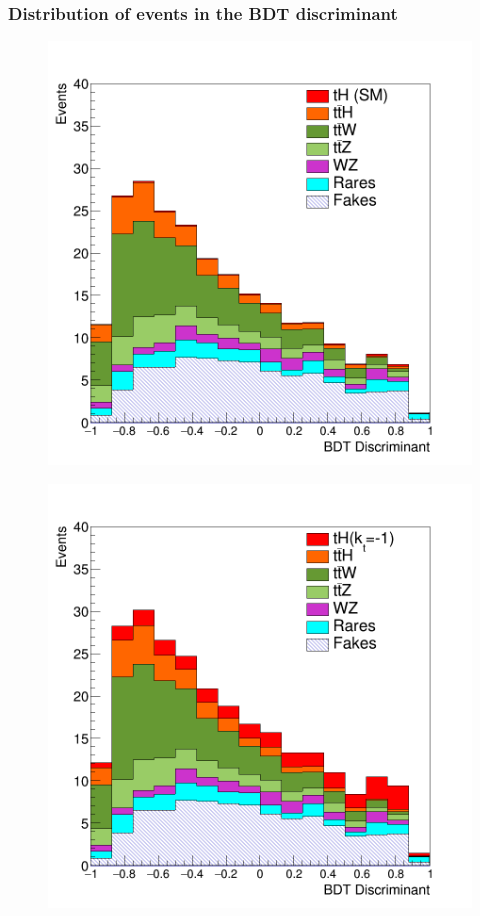 \documentclass[11pt]{beamer}
\begin{document}
{\nologo
\begin{frame}
\frametitle{Distribution of events in the BDT discriminant}
\begin{minipage}[b]{.48\textwidth}
\begin{figure}
	\centering
	\includegraphics[width=\textwidth]{figures/kos.png}
\end{figure}
\end{minipage}
\hfill
\begin{minipage}[b]{.48\textwidth}
	\begin{figure}
		\centering
		\includegraphics[width=\textwidth]{figures/kos2.png}

\end{figure}
\end{minipage}
\end{frame}}
\end{document}
